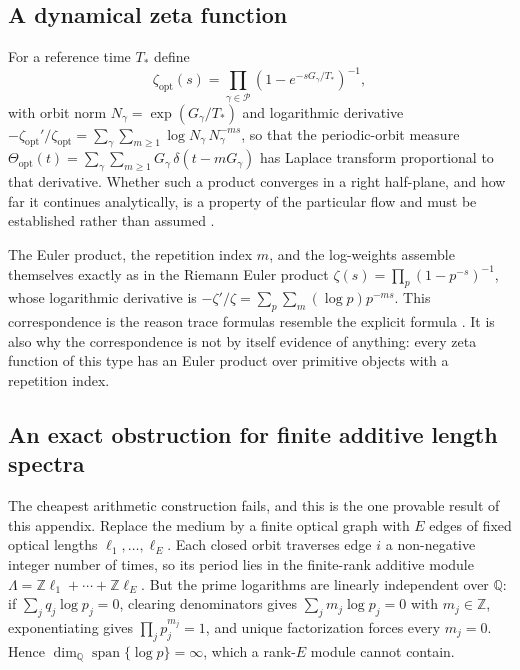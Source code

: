 \documentclass[11pt]{article}
\begin{document}
\subsection{A dynamical zeta function}

For a reference time $T_*$ define
\begin{equation}
\zeta_{\mathrm{opt}}(s) = \prod_{\gamma\in\mathcal{P}}
\left(1 - e^{-sG_\gamma/T_*}\right)^{-1},
\end{equation}
with orbit norm $N_\gamma=\exp(G_\gamma/T_*)$ and logarithmic derivative
$-\zeta_{\mathrm{opt}}'/\zeta_{\mathrm{opt}}
= \sum_{\gamma}\sum_{m\ge1}\log N_\gamma\,N_\gamma^{-ms}$, so that the periodic-orbit
measure $\Theta_{\mathrm{opt}}(t)=\sum_\gamma\sum_{m\ge1}G_\gamma\,\delta(t-mG_\gamma)$
has Laplace transform proportional to that derivative. Whether such a product converges
in a right half-plane, and how far it continues analytically, is a property of the
particular flow and must be established rather than assumed \cite{ruelle2002}.

The Euler product, the repetition index $m$, and the log-weights assemble themselves
exactly as in the Riemann Euler product
$\zeta(s)=\prod_p(1-p^{-s})^{-1}$, whose logarithmic derivative is
$-\zeta'/\zeta=\sum_p\sum_m(\log p)p^{-ms}$. This correspondence is the reason trace
formulas resemble the explicit formula \cite{gutzwiller1990}. It is also why the
correspondence is not by itself evidence of anything: every zeta function of this type
has an Euler product over primitive objects with a repetition index.

\subsection{An exact obstruction for finite additive length spectra}

The cheapest arithmetic construction fails, and this is the one provable result of this
appendix. Replace the medium by a finite optical graph with $E$ edges of fixed optical
lengths $\ell_1,\dots,\ell_E$. Each closed orbit traverses edge $i$ a non-negative
integer number of times, so its period lies in the finite-rank additive module
$\Lambda = \mathbb{Z}\ell_1 + \cdots + \mathbb{Z}\ell_E$. But the prime logarithms are
linearly independent over $\mathbb{Q}$: if $\sum_j q_j\log p_j = 0$, clearing
denominators gives $\sum_j m_j\log p_j=0$ with $m_j\in\mathbb{Z}$, exponentiating gives
$\prod_j p_j^{m_j}=1$, and unique factorization forces every $m_j=0$. Hence
$\dim_{\mathbb{Q}}\operatorname{span}\{\log p\}=\infty$, which a rank-$E$ module cannot
contain.
\end{document}
